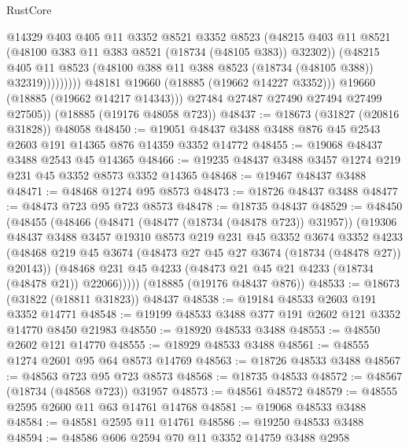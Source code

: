\begin{lexlean}{RustCore}
\begin{coremodule}
                          @14329
                          @403
                          @405
                          @11
                          @3352
                          @8521
                          @3352
                          @8523
                          (@48215
                            @403
                            @11
                            @8521
                            (@48100 @383 @11 @383 @8521 (@18734 (@48105 @383)) @32302))
                          (@48215
                            @405
                            @11
                            @8523
                            (@48100 @388 @11 @388 @8523 (@18734 (@48105 @388)) @32319)))))))))
            @48181
            @19660
            (@18885 (@19662 @14227 @3352)))
          @19660
          (@18885 (@19662 @14217 @14343)))
        @27484
        @27487
        @27490
        @27494
        @27499
        @27505))
    (@18885 (@19176 @48058 @723))
@48437 := @18673 (@31827 (@20816 @31828)) @48058
@48450 := @19051 @48437 @3488 @3488 @876 @45 @2543 @2603 @191 @14365 @876 @14359 @3352 @14772
@48455 := @19068 @48437 @3488 @2543 @45 @14365
@48466 := @19235 @48437 @3488 @3457 @1274 @219 @231 @45 @3352 @8573 @3352 @14365
@48468 := @19467 @48437 @3488
@48471 := @48468 @1274 @95 @8573
@48473 := @18726 @48437 @3488
@48477 := @48473 @723 @95 @723 @8573
@48478 := @18735 @48437
@48529 := @48450
    (@48455
      (@48466
        (@48471 (@48477 (@18734 (@48478 @723)) @31957))
        (@19306
          @48437
          @3488
          @3457
          @19310
          @8573
          @219
          @231
          @45
          @3352
          @3674
          @3352
          @4233
          (@48468 @219 @45 @3674 (@48473 @27 @45 @27 @3674 (@18734 (@48478 @27)) @20143))
          (@48468 @231 @45 @4233 (@48473 @21 @45 @21 @4233 (@18734 (@48478 @21)) @22066)))))
    (@18885 (@19176 @48437 @876))
@48533 := @18673 (@31822 (@18811 @31823)) @48437
@48538 := @19184 @48533 @2603 @191 @3352 @14771
@48548 := @19199 @48533 @3488 @377 @191 @2602 @121 @3352 @14770 @8450 @21983
@48550 := @18920 @48533 @3488
@48553 := @48550 @2602 @121 @14770
@48555 := @18929 @48533 @3488
@48561 := @48555 @1274 @2601 @95 @64 @8573 @14769
@48563 := @18726 @48533 @3488
@48567 := @48563 @723 @95 @723 @8573
@48568 := @18735 @48533
@48572 := @48567 (@18734 (@48568 @723)) @31957
@48573 := @48561 @48572
@48579 := @48555 @2595 @2600 @11 @63 @14761 @14768
@48581 := @19068 @48533 @3488
@48584 := @48581 @2595 @11 @14761
@48586 := @19250 @48533 @3488
@48594 := @48586 @606 @2594 @70 @11 @3352 @14759 @3488 @2958

\end{coremodule}
\end{lexlean}
